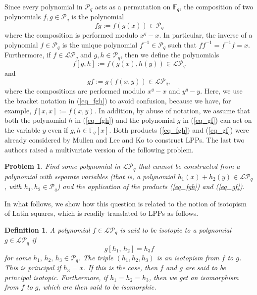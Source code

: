 \documentclass[pdflatex,sn-mathphys-num]{sn-jnl}
\theoremstyle{thmstyleone}%
\newtheorem{definition}{Definition}[section]
\newtheorem{problem}{Problem}[section]
\begin{document}
Since every polynomial in $\mathcal{P}_q$ acts as a permutation on $\mathbb{F}_q$, the composition of two polynomials $f,g\in\mathcal{P}_q$ is the polynomial
\begin{equation}\label{eq_fg}
fg:=f(g(x))\in\mathcal{P}_q    
\end{equation}
where the composition is performed modulo $x^q-x$. In particular, the inverse of a polynomial $f\in\mathcal{P}_q$ is the unique polynomial $f^{-1}\in \mathcal{P}_q$ such that $ff^{-1}=f^{-1}f=x$. Furthermore, if $f\in\mathcal{LP}_q$ and $g,h\in\mathcal{P}_q$, then we define the polynomials
\begin{equation}\label{eq_fgh}f[g,h]:=f(g(x),h(y))\in \mathcal{LP}_q
\end{equation}
and
\begin{equation}\label{eq_gf}
gf:=g(f(x,y))\in\mathcal{LP}_q,
\end{equation}
where the compositions are performed modulo $x^q-x$ and $y^q-y$. Here, we use the bracket notation in (\ref{eq_fgh}) to avoid confusion, because we have, for example, $f[x,x]:=f(x,y)$. In addition, by abuse of notation, we assume that both the polynomial $h$ in (\ref{eq_fgh}) and the polynomial $g$ in (\ref{eq_gf}) can act on the variable $y$ even if $g,h\in\mathbb{F}_q[x]$. Both products (\ref{eq_fgh}) and (\ref{eq_gf}) were already considered by Mullen  \cite{Mullen1981} and Lee and Ko \cite{Lee1994} to construct LPPs. The last two authors raised a multivariate version of the following problem.

\begin{problem}\label{problem_Lee} Find some polynomial in $\mathcal{LP}_q$ that cannot be constructed from a polynomial with separate variables (that is, a polynomial $h_1(x)+h_2(y)\in\mathcal{LP}_q$, with $h_1,h_2\in\mathcal{P}_q$) and the application of the products (\ref{eq_fgh}) and (\ref{eq_gf}).    
\end{problem}

\vspace{0.2cm}

In what follows, we show how this question is related to the notion of isotopism of Latin squares, which is readily translated to LPPs as follows.

\begin{definition}\label{definition_isotopic} A polynomial $f\in \mathcal{LP}_q$ is said to be {\em isotopic} to a polynomial $g\in \mathcal{LP}_q$ if 
\begin{equation}\label{eq_isotopism}
g[h_1,\, h_2]=h_3f
\end{equation}
for some $h_1,\,h_2,\,h_3\in \mathcal{P}_q$. The triple $(h_1,h_2,h_3)$ is an {\em isotopism} from $f$ to $g$. This is {\em principal} if $h_3=x$. If this is the case, then $f$ and $g$ are said to be {\em principal isotopic}. Furthermore, if $h_1=h_2=h_3$, then we get an {\em isomorphism} from $f$ to $g$, which are then said to be {\em isomorphic}. 
\end{definition}
\end{document}
